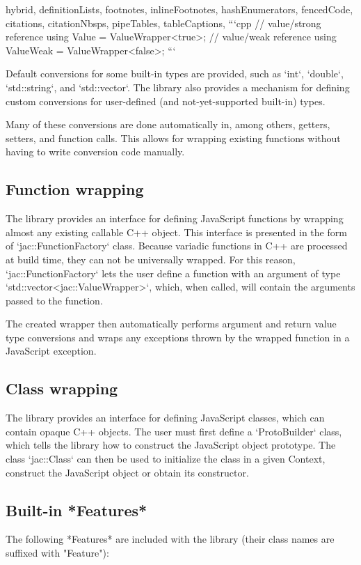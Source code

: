 \documentclass[
  digital,
  oneside,
  nosansbold,
  nocolorbold,
  lof,
  lot
]{fithesis4}
\begin{document}
\begin{markdown*}{%
  hybrid,
  definitionLists,
  footnotes,
  inlineFootnotes,
  hashEnumerators,
  fencedCode,
  citations,
  citationNbsps,
  pipeTables,
  tableCaptions,
}
```cpp
// value/strong reference
using Value = ValueWrapper<true>;
// value/weak reference
using ValueWeak = ValueWrapper<false>;
```

Default conversions for some built-in types are provided, such as `int`, `double`, `std::string`, and `std::vector`. The library also provides a mechanism for defining custom conversions for user-defined (and not-yet-supported built-in) types.

Many of these conversions are done automatically in, among others, getters, setters, and function calls. This allows for wrapping existing functions without having to write conversion code manually.

\subsection{Function wrapping}

The library provides an interface for defining JavaScript functions by wrapping almost any existing callable C++ object. This interface is presented in the form of `jac::FunctionFactory` class. Because variadic functions in C++ are processed at build time, they can not be universally wrapped. For this reason, `jac::FunctionFactory` lets the user define a function with an argument of type `std::vector<jac::ValueWrapper>`, which, when called, will contain the arguments passed to the function.

The created wrapper then automatically performs argument and return value type conversions and wraps any exceptions thrown by the wrapped function in a JavaScript exception.

\subsection{Class wrapping}

The library provides an interface for defining JavaScript classes, which can contain opaque C++ objects. The user must first define a `ProtoBuilder` class, which tells the library how to construct the JavaScript object prototype. The class `jac::Class` can then be used to initialize the class in a given Context, construct the JavaScript object or obtain its constructor.

\subsection{Built-in *Features*}

The following *Features* are included with the library (their class names are suffixed with "Feature"):


\end{markdown*}
\end{document}
